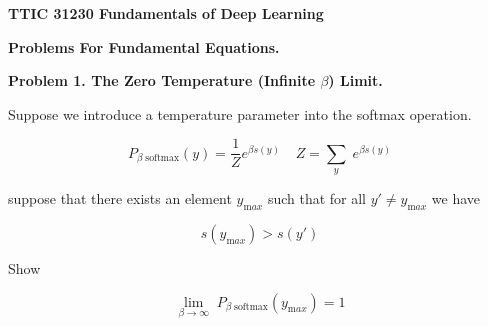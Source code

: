 \documentclass{article}
\begin{document}
\centerline{\bf TTIC 31230 Fundamentals of Deep Learning}
\centerline{\bf Problems For Fundamental Equations.}

\bigskip
{\bf Problem 1. The Zero Temperature (Infinite $\beta$) Limit.}

Suppose we introduce a temperature parameter into the softmax operation.

$$P_{\beta\;\mathrm{softmax}}(y) = \frac{1}{Z} e^{\beta s(y)} ~\;\;\;Z = \sum_y\;e^{\beta s(y)}$$

suppose that there exists an element $y_{\mathrm max}$ such that
for all $y' \ne y_{\mathrm max}$ we have

$$s(y_{\mathrm max}) > s(y')$$

Show 

$$\lim_{\beta \rightarrow \infty} \;P_{\beta\;\mathrm{softmax}}(y_{\mathrm max}) = 1$$

      
\end{document}
